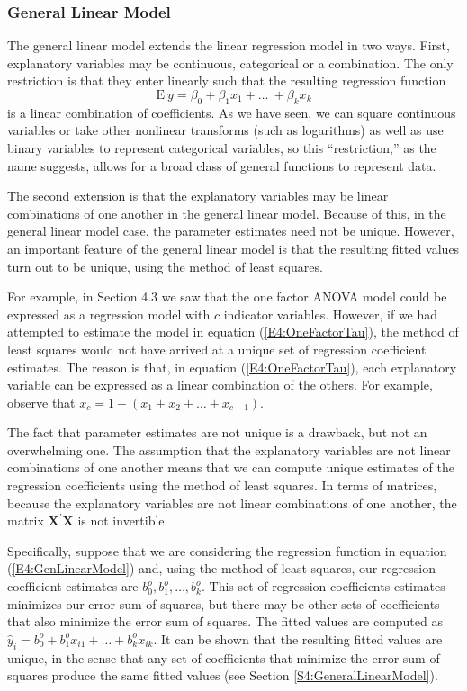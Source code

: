 \subsubsection*{General Linear Model}

The general linear model extends the linear regression model in two
ways. First, explanatory variables may be continuous, categorical or
a combination. The only restriction is that they enter linearly such
that the resulting regression function
\begin{equation}\label{E4:GenLinearModel}
\mathrm{E}~y = \beta_0 + \beta_1 x_1 + \ldots \ + \beta_k x_k
\end{equation}
is a linear combination of coefficients. As we have seen, we can
square continuous variables or take other nonlinear transforms (such
as logarithms) as well as use binary variables to represent
categorical variables, so this ``restriction,'' as the name
suggests, allows for a broad class of general functions to represent
data.

The second extension is that the explanatory variables may be linear
combinations of one another in the general linear model. Because of
this, in the general linear model case, the parameter estimates need
not be unique. However, an important feature of the general linear
model is that the resulting fitted values turn out to be unique,
using the method of least squares.

For example, in Section 4.3 we saw that the one factor ANOVA model
could be expressed as a regression model with $c$ indicator
variables. However, if we had attempted to estimate the model in
equation (\ref{E4:OneFactorTau}), the method of least squares would
not have arrived at a unique set of regression coefficient
estimates. The reason is that, in equation (\ref{E4:OneFactorTau}),
each explanatory variable can be expressed as a linear combination
of the others. For example, observe that $x_c = 1 - (x_1 + x_2 +
\ldots + x_{c-1})$.

The fact that parameter estimates are not unique is a drawback, but
not an overwhelming one. The assumption that the explanatory
variables are not linear combinations of one another means that we
can compute unique estimates of the regression coefficients using
the method of least squares. In terms of matrices, because the
explanatory variables are not linear combinations of one another,
the matrix $\mathbf{X}^{\prime}\mathbf{X}$ is not invertible.

Specifically, suppose that we are considering the regression
function in equation (\ref{E4:GenLinearModel}) and, using the method
of least squares, our regression coefficient estimates are $b_0^{o},
b_1^{o}, \ldots, b_k^{o}$. This set of regression coefficients
estimates minimizes our error sum of squares, but there may be other
sets of coefficients that also minimize the error sum of squares.
The fitted values are computed as $\hat{y}_i = b_0^{o} + b_1^{o}
x_{i1} + \ldots + b_k^{o} x_{ik}$. It can be shown that the
resulting fitted values are unique, in the sense that any set of
coefficients that minimize the error sum of squares produce the same
fitted values (see Section \ref{S4:GeneralLinearModel}).

